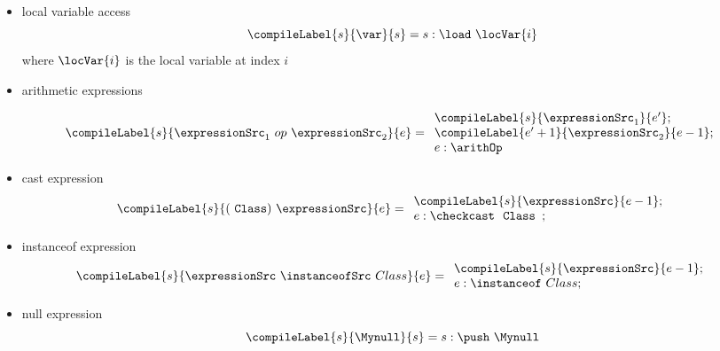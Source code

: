 \begin{itemize}
  
   \item local variable access
     $$\compileLabel{s}{ \var }{s} =  s: \load \ \locVar{i} $$ 
   where $\locVar{i} $ is the local variable at index $i$


                
   \item arithmetic expressions
     
     $$\compileLabel{s}{ \expressionSrc_1 \ op \ \expressionSrc_2 }{e} = 
                 \begin{array}{l}
                       \compileLabel{s}{ \expressionSrc_1}{  e'  } ; \\
                       \compileLabel{e' + 1}{ \expressionSrc_2}{ e - 1  }; \\
                       e:\arithOp
                 \end{array}     
                $$ 
                       

   \item cast expression 
     $$ \compileLabel{s}{ (\mbox{ \rm \texttt{Class}}   ) \ \expressionSrc }{e} = 
              \begin{array}{l}  
                 \compileLabel{s}{\expressionSrc}{e  - 1};\\
                  e : \checkcast \ \mbox{ \rm \texttt{Class }} ;
              \end{array}
$$
	      

  \item instanceof expression
    $$ \compileLabel{s}{\expressionSrc \ \instanceofSrc \ Class }{e} = 
         \begin{array}{l}
              \compileLabel{s}{\expressionSrc}{ e  -1 };\\
               e : \instanceof \ Class;
         \end{array} $$

  \item null expression
    $$ \compileLabel{s}{\Mynull }{s } = s: \push \ \Mynull$$
          

\end{itemize}
